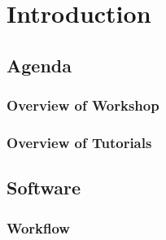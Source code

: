\documentclass{beamer}
\begin{document}
\section{Introduction}
\subsection{Agenda}


\begin{frame}
  \frametitle{Overview of Workshop}
  
  

\end{frame}


\begin{frame}
  \frametitle{Overview of Tutorials}
  \summary{}
  
  

\end{frame}


\subsection{Software}

\begin{frame}
  \frametitle{Workflow}
  \summary{}

  
  
\end{frame}
\end{document}
